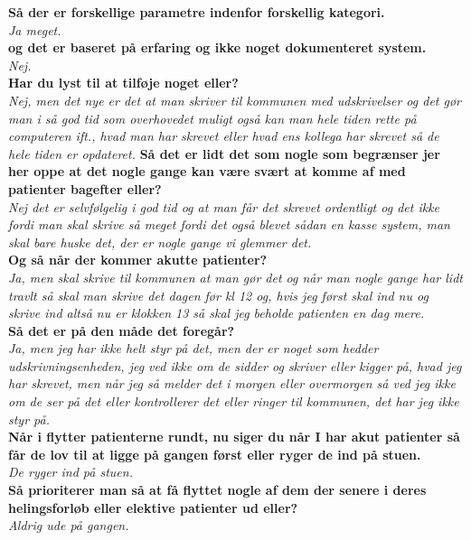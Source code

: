 \noindent
\textbf{Så der er forskellige parametre indenfor forskellig kategori.}\\
\noindent
\textit{Ja meget.}\\
\noindent
\textbf{og det er baseret på erfaring og ikke noget dokumenteret system.}\\
\noindent
\textit{ Nej.}\\
\noindent
\textbf{Har du lyst til at tilføje noget eller?}\\
\noindent
\textit{Nej, men det nye er det at man skriver til kommunen med udskrivelser og det gør man i så god tid som overhovedet muligt også kan man hele tiden rette på computeren ift., hvad man har skrevet eller hvad ens kollega har skrevet så de hele tiden er opdateret. }
\textbf{Så det er lidt det som nogle som begrænser jer her oppe at det nogle gange kan være svært at komme af med patienter bagefter eller?}\\
\noindent
\textit{Nej det er selvfølgelig i god tid og at man får det skrevet ordentligt og det ikke fordi man skal skrive så meget fordi det også blevet sådan en kasse system, man skal bare huske det, der er nogle gange vi glemmer det.}\\
\noindent
\textbf{Og så når der kommer akutte patienter?}\\
\noindent
\textit{Ja, men skal skrive til kommunen at man gør det og når man nogle gange har lidt travlt så skal man skrive det dagen før kl 12 og, hvis jeg først skal ind nu og skrive ind altså nu er klokken 13 så skal jeg beholde patienten en dag mere.}\\
\noindent
\textbf{Så det er på den måde det foregår?}\\
\noindent
\textit{Ja, men jeg har ikke helt styr på det, men der er noget som hedder udskrivningsenheden, jeg ved ikke om de sidder og skriver eller kigger på, hvad jeg har skrevet, men når jeg så melder det i morgen eller overmorgen så ved jeg ikke om de ser på det eller kontrollerer det eller ringer til kommunen, det har jeg ikke styr på.}\\
\noindent
\textbf{Når i flytter patienterne rundt, nu siger du når I har akut patienter så får de lov til at ligge på gangen først eller ryger de ind på stuen.}\\
\noindent
\textit{De ryger ind på stuen.}\\
\noindent
\textbf{Så prioriterer man så at få flyttet nogle af dem der senere i deres helingsforløb eller elektive patienter ud eller?}\\
\noindent
\textit{ Aldrig ude på gangen.}\\
